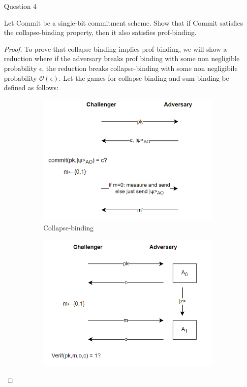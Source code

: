 \begin{solution}{Question 4}\label{ques:4}
    \begin{question}
    Let Commit be a single-bit commitment scheme. Show that if Commit satisfies the collapse-binding property, then it also satisfies prof-binding.
    \end{question}
    \tcblower{}
    \begin{proof}
    To prove that collapse binding implies prof binding, we will show a reduction where if the adversary breaks prof binding with some non negligible probability $\epsilon$, the reduction breaks collapse-binding with some non negligibile probability $\mathcal{O}(\epsilon)$. Let the games for collapse-binding and sum-binding be defined as follows:\\
    \begin{figure}[H]
      \begin{subfigure}[b]{0.5\textwidth}
        \includegraphics[width=\textwidth]{images/collapse.png}
        \caption{Collapse-binding}
        \label{fig:cb}
      \end{subfigure}
      \hfill
      \begin{subfigure}[b]{0.48\textwidth}
        \includegraphics[width=\textwidth]{images/prof.png}

\end{subfigure}
\end{figure}
\end{proof}
\end{solution}
